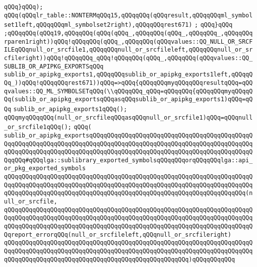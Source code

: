 \verb|qQQq}qQQq);|\newline
\verb|qQQq(qQQqlr_table::NONTERMqQQq15,qQQqqQQq(qQQqresult,qQQqqQQqml_symbolset1left,qQQqqQQqml_symbolset2right),qQQqqQQqrest671)|\newline
\verb|;|\newline
\verb|qQQq}qQQq|\newline
\verb|;qQQqqQQq(qQQq19,qQQqqQQq(qQQq(qQQq_,qQQqqQQq(qQQq_,qQQqqQQq_,qQQqqQQqrparen1right))qQQq!qQQqqQQq(qQQq_,qQQqqQQq(qQQqvalues::QQ_NULL_OR_SRCFILEqQQqnull_or_srcfile1,qQQqqQQqnull_or_srcfileleft,qQQqqQQqnull_or_srcfileright))qQQq!qQQqqQQq_qQQq!qQQqqQQq(qQQq_,qQQqqQQq(qQQqvalues::QQ_SUBLIB_OR_APIPKG_EXPORTSqQQq|\newline
\verb|sublib_or_apipkg_exports1,qQQqqQQqsublib_or_apipkg_exports1left,qQQqqQQq_))qQQq!qQQqqQQqrest671))qQQq=>qQQq{qQQqqQQqmyqQQqqQQqresultqQQq=qQQqvalues::QQ_ML_SYMBOLSETqQQq(\\qQQqqQQq_qQQq=qQQqqQQq{qQQqqQQqmyqQQqqQQq(sublib_or_apipkg_exportsqQQqasqQQqsublib_or_apipkg_exports1)qQQq=qQQq|\newline
\verb|sublib_or_apipkg_exports1qQQq();|\newline
\verb|qQQqmyqQQqqQQq(null_or_srcfileqQQqasqQQqnull_or_srcfile1)qQQq=qQQqnull_or_srcfile1qQQq();|\newline
\verb|qQQq(|\newline
\verb|sublib_or_apipkg_exportsqQQqqQQqqQQqqQQqqQQqqQQqqQQqqQQqqQQqqQQqqQQqqQQqqQQqqQQqqQQqqQQqqQQqqQQqqQQqqQQqqQQqqQQqqQQqqQQqqQQqqQQqqQQqqQQqqQQqqQQqqQQqqQQqqQQqqQQqqQQqqQQqqQQqqQQqqQQqqQQqqQQqqQQqqQQqqQQqqQQqqQQqqQQqqQQq#qQQqlga::sublibrary_exported_symbolsqQQqqQQqorqQQqqQQqlga::api_or_pkg_exported_symbols|\newline
\verb|qQQqqQQqqQQqqQQqqQQqqQQqqQQqqQQqqQQqqQQqqQQqqQQqqQQqqQQqqQQqqQQqqQQqqQQqqQQqqQQqqQQqqQQqqQQqqQQqqQQqqQQqqQQqqQQqqQQqqQQqqQQqqQQqqQQqqQQqqQQqqQQqqQQqqQQqqQQqqQQqqQQqqQQqqQQqqQQqqQQqqQQqqQQqqQQqqQQqqQQqqQQqqQQq(null_or_srcfile,|\newline
\verb|qQQqqQQqqQQqqQQqqQQqqQQqqQQqqQQqqQQqqQQqqQQqqQQqqQQqqQQqqQQqqQQqqQQqqQQqqQQqqQQqqQQqqQQqqQQqqQQqqQQqqQQqqQQqqQQqqQQqqQQqqQQqqQQqqQQqqQQqqQQqqQQqqQQqqQQqqQQqqQQqqQQqqQQqqQQqqQQqqQQqqQQqqQQqqQQqqQQqqQQqqQQqqQQqqQQqreport_errorqQQq(null_or_srcfileleft,qQQqnull_or_srcfileright)|\newline
\verb|qQQqqQQqqQQqqQQqqQQqqQQqqQQqqQQqqQQqqQQqqQQqqQQqqQQqqQQqqQQqqQQqqQQqqQQqqQQqqQQqqQQqqQQqqQQqqQQqqQQqqQQqqQQqqQQqqQQqqQQqqQQqqQQqqQQqqQQqqQQqqQQqqQQqqQQqqQQqqQQqqQQqqQQqqQQqqQQqqQQqqQQqqQQqqQQq)qQQqqQQqqQQq|\newline

